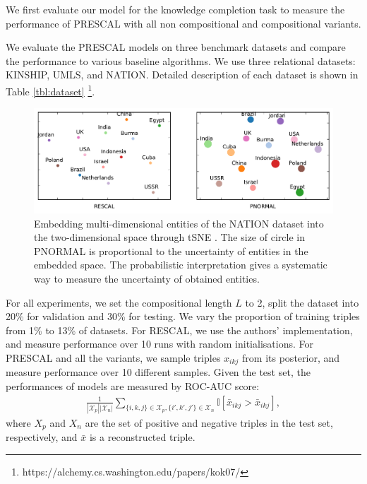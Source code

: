 We first evaluate our model for the knowledge completion task
to measure the performance of PRESCAL with all non compositional and compositional variants.

We evaluate the PRESCAL models on three benchmark datasets and compare the performance to various baseline 
algorithms. We use three relational datasets: KINSHIP, UMLS, and NATION. Detailed description of each 
dataset is shown in Table \ref{tbl:dataset} \footnote{https://alchemy.cs.washington.edu/papers/kok07/}.

\begin{figure}[t]
	\centering
	
	\includegraphics[width=0.8\linewidth]{images/embedding_nation.pdf}

	\caption{\label{fig:tsne} Embedding multi-dimensional entities of the NATION dataset into the two-dimensional space through tSNE \cite{VanDerMaaten2008}. The size of circle in PNORMAL is proportional to the uncertainty of entities in the embedded space. The probabilistic interpretation gives a systematic way to measure the uncertainty of obtained entities.}
\end{figure}

For all experiments, we set the compositional length $L$ to 2, split the dataset into 20\% for validation and 30\% for testing. We vary the proportion of training triples
from 1\% to 13\% of datasets. For RESCAL, we use the authors' implementation, and measure performance over 10 runs with random initialisations. For PRESCAL and all the variants, we sample triples $x_{ikj}$ from its posterior, and measure performance over 10 different samples.
Given the test set, the performances of models are measured by ROC-AUC score:
\begin{align}
\frac{1}{|\mathcal{X}_p|  |\mathcal{X}_n|} \sum_{\{i,k,j\} \in \mathcal{X}_p, \{i',k',j'\} \in \mathcal{X}_n} \mathbb{I}[\bar{x}_{ikj} > \bar{x}_{ikj}],
\end{align}
where $X_p$ and $X_n$ are the set of positive and negative triples in the test set, respectively, and $\bar{x}$ is a reconstructed triple.


